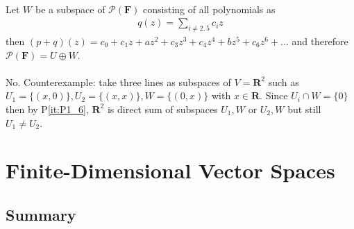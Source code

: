 \documentclass[11pt,notitlepage,oneside]{article}
\newcommand{\pref}[1]{P\ref{#1}}
\newcommand{\exo}[1]{%
\addtocontents{toc}{\protect\setcounter{tocdepth}{2}}%
\paragraph{#1}}
\begin{document}
\exo{} Let $W$ be a subspace of $\mathcal{P}(\mathbf{F})$ consisting of all polynomials as
\begin{align}
  q(z) = \sum\limits_{i\neq2,5} c_i z
\end{align}
then $(p+q)(z) = c_0 + c_1z + a z^2+ c_3 z^3 + c_4 z^4 + b z^5 + c_6 z^6 + ...$ and therefore $\mathcal{P}(\mathbf{F}) = U \oplus W$. 

\exo{} No. Counterexample: take three lines as subspaces of $V=\mathbf{R}^2$ such as $U_1=\{(x,0)\}, U_2=\{(x,x)\}, W= \{(0,x)\}$ with $x\in \mathbf{R}$. Since
$U_i\cap W = \{0\}$ then by \pref{it:P1_6}, $\mathbf{R}^2$ is direct sum of subspaces $U_1,W$ or $U_2,W$ but still $U_1\neq U_2$. 

\newpage
\section{Finite-Dimensional Vector Spaces}
\subsection*{Summary}

\newpage
{}
\small


\end{document}
